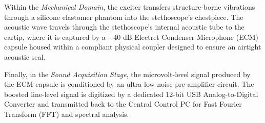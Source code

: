Within the \textit{Mechanical Domain}, the exciter transfers structure-borne vibrations through a silicone elastomer phantom into the stethoscope's chestpiece. The acoustic wave travels through the stethoscope's internal acoustic tube to the eartip, where it is captured by a $-40\text{ dB}$ Electret Condenser Microphone (ECM) capsule housed within a compliant physical coupler designed to ensure an airtight acoustic seal.

Finally, in the \textit{Sound Acquisition Stage}, the microvolt-level signal produced by the ECM capsule is conditioned by an ultra-low-noise pre-amplifier circuit. The boosted line-level signal is digitized by a dedicated 12-bit USB Analog-to-Digital Converter and transmitted back to the Central Control PC for Fast Fourier Transform (FFT) and spectral analysis.


